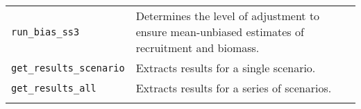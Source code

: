 \documentclass[10pt]{article}
\begin{document}
\begin{longtable}[c]{@{}ll@{}}
\begin{minipage}[t]{0.32\columnwidth}
\texttt{run\_bias\_ss3}
\end{minipage} & \begin{minipage}[t]{0.57\columnwidth}\raggedright
Determines the level of adjustment to ensure mean-unbiased estimates of
recruitment and biomass.
\end{minipage}
\\\noalign{\medskip}
\begin{minipage}[t]{0.32\columnwidth}\raggedright
\texttt{get\_results\_scenario}
\end{minipage} & \begin{minipage}[t]{0.57\columnwidth}\raggedright
Extracts results for a single scenario.
\end{minipage}
\\\noalign{\medskip}
\begin{minipage}[t]{0.32\columnwidth}\raggedright
\texttt{get\_results\_all}
\end{minipage} & \begin{minipage}[t]{0.57\columnwidth}\raggedright
Extracts results for a series of scenarios.
\end{minipage}
\\\noalign{\medskip}
\hline
\end{longtable}

%
%
%
% 
\end{document}
